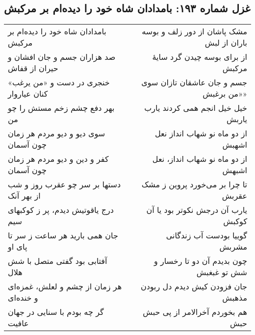\begin{center}
\section*{غزل شماره ۱۹۳: بامدادان شاه خود را دیده‌ام بر مرکبش}
\label{sec:193}
\begin{longtable}{l p{0.5cm} r}
بامدادان شاه خود را دیده‌ام بر مرکبش
&&
مشک پاشان از دور زلف و بوسه باران از لبش
\\
صد هزاران جسم و جان افشان و حیران از قفاش
&&
از برای بوسه چیدن گرد سایهٔ مرکبش
\\
خنجری در دست و «من یرغب» کنان عیاروار
&&
جسم و جان عاشقان تازان سوی «من برغبش»
\\
بهر دفع چشم زخم مستش را چو من
&&
خیل خیل انجم همی کردند یارب یاربش
\\
سوی دیو و دیو مردم هر زمان چون آسمان
&&
از دو ماه نو شهاب انداز نعل اشهبش
\\
کفر و دین و دیو مردم هر زمان چون آسمان
&&
از دو ماه نو شهاب انداز، نعل اشبهش
\\
دستها بر سر چو عقرب روز و شب از بهر آنک
&&
تا چرا بر می‌خورد پروین ز مشک عقربش
\\
درج یاقوتیش دیدم، پر ز کوکبهای سیم
&&
یارب آن درجش نکوتر بود یا آن کوکبش
\\
جان همی بارید هر ساعت ز سر تا پای او
&&
گوییا بودست آب زندگانی مشربش
\\
آفتابی بود گفتی متصل با شش هلال
&&
چون بدیدم آن دو تا رخسار و شش تو غبغبش
\\
هر زمان از چشم و لعلش، غمزه‌ای و خنده‌ای
&&
جان فزودن کیش دیدم دل ربودن مذهبش
\\
گر چه بودم با سنایی در جهان عافیت
&&
هم بخوردم آخرالامر از پی حبش حبش
\\
\end{longtable}
\end{center}
